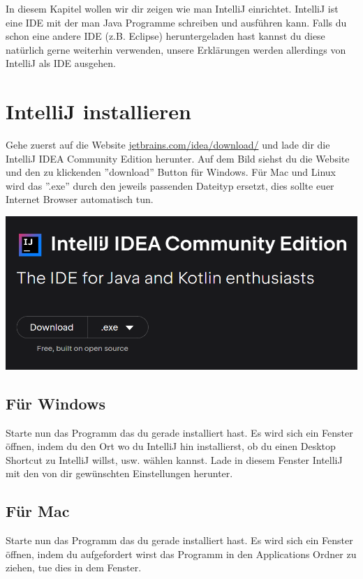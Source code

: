 
\label{ex2}

In diesem Kapitel wollen wir dir zeigen wie man IntelliJ einrichtet. IntelliJ ist eine IDE mit der man Java Programme schreiben und ausführen kann. Falls du schon eine andere IDE (z.B. Eclipse) heruntergeladen hast kannst du diese natürlich gerne weiterhin verwenden, unsere Erklärungen werden allerdings von IntelliJ als IDE ausgehen.\newline

\section*{IntelliJ installieren}
\label{ex1}
Gehe zuerst auf die Website \href{\intellijurl}{jetbrains.com/idea/download/} und lade dir die IntelliJ IDEA Community Edition herunter. Auf dem Bild siehst du die Website und den zu klickenden ''download'' Button für Windows. Für Mac und Linux wird das ''.exe'' durch den jeweils passenden Dateityp ersetzt, dies sollte euer Internet Browser automatisch tun.
\begin{center}
    \includegraphics[width=\linewidth]{./figures/IntelliJ download site.PNG}
\end{center}
\subsection*{Für Windows}
Starte nun das Programm das du gerade installiert hast. Es wird sich ein Fenster öffnen, indem du den Ort wo du IntelliJ hin installierst, ob du einen Desktop Shortcut zu IntelliJ willst, usw. wählen kannst. Lade in diesem Fenster IntelliJ mit den von dir gewünschten Einstellungen herunter.\newline

\subsection*{Für Mac}
Starte nun das Programm das du gerade installiert hast. Es wird sich ein Fenster öffnen, indem du aufgefordert wirst das Programm in den Applications Ordner zu ziehen, tue dies in dem Fenster.\newline

